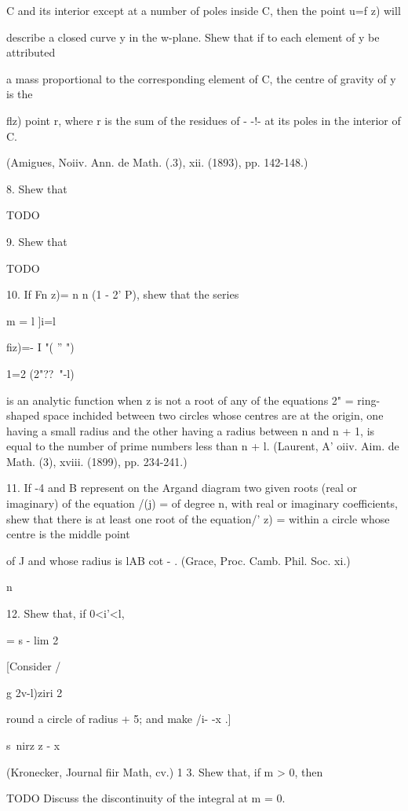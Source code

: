 \begin{enumerate}
C and its interior except at a number of poles inside C, then the
point u=f z) will

describe a closed curve y in the w-plane. Shew that if to each element
of y be attributed

a mass proportional to the corresponding element of C, the centre of
gravity of y is the

flz) point r, where r is the sum of the residues of  - -!- at its
poles in the interior of C.

(Amigues, Noiiv. Ann. de Math. (.3), xii. (1893), pp. 142-148.)

8. Shew that

TODO

9. Shew that

TODO

%
%

10. If Fn z)= n n (1 - 2' P), shew that the series

m = l ]i=l

fiz)=- I "( '' ")

1=2 (2"??~"-l)%

is an analytic function when z is not a root of any of the equations
2" = %
ring-shaped space inchided between two circles whose centres are at
the origin, one having a small radius and the other having a radius
between n and n + 1, is equal to the number of prime numbers less than
n + l. (Laurent, A' oiiv. Aim. de Math. (3), xviii. (1899), pp.
234-241.)

11. If -4 and B represent on the Argand diagram two given roots (real
or imaginary) of the equation /(j) = of degree n, with real or
imaginary coefficients, shew that there is at least one root of the
equation/' z) = within a circle whose centre is the middle point

of J and whose radius is lAB cot - . (Grace, Proc. Camb. Phil. Soc.
xi.)

n

12. Shew that, if 0<i'<l,

= s - lim 2

[Consider /

g 2v-l)ziri 2

round a circle of radius + 5; and make /i- -x .]

s\ nirz z - x

(Kronecker, Journal fiir Math, cv.) 1 3. Shew that, if m > 0, then

TODO
Discuss the discontinuity of the integral at m = 0.


\end{enumerate}
